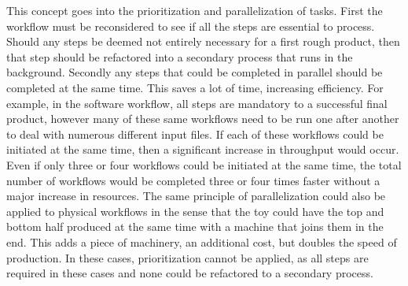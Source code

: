 This concept goes into the prioritization and parallelization of tasks. First the workflow must be reconsidered to see if all the steps are essential to process. Should any steps be deemed not entirely necessary for a first rough product, then that step should be refactored into a secondary process that runs in the background. Secondly any steps that could be completed in parallel should be completed at the same time. This saves a lot of time, increasing efficiency. For example, in the software workflow, all steps are mandatory to a successful final product, however many of these same workflows need to be run one after another to deal with numerous different input files. If each of these workflows could be initiated at the same time, then a significant increase in throughput would occur. Even if only three or four workflows could be initiated at the same time, the total number of workflows would be completed three or four times faster without a major increase in resources. The same principle of parallelization could also be applied to physical workflows in the sense that the toy could have the top and bottom half produced at the same time with a machine that joins them in the end. This adds a piece of machinery, an additional cost, but doubles the speed of production. In these cases, prioritization cannot be applied, as all steps are required in these cases and none could be refactored to a secondary process.

